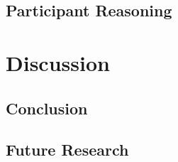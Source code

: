 \documentclass[]{interact}
\theoremstyle{plain}%
\theoremstyle{definition}
\theoremstyle{remark}
\begin{document}
\hypertarget{participant-reasoning}{%
\subsection{Participant Reasoning}\label{participant-reasoning}}

\hypertarget{discussion}{%
\section{Discussion}\label{discussion}}

\hypertarget{conclusion}{%
\subsection{Conclusion}\label{conclusion}}

\hypertarget{future-research}{%
\subsection{Future Research}\label{future-research}}
\end{document}
